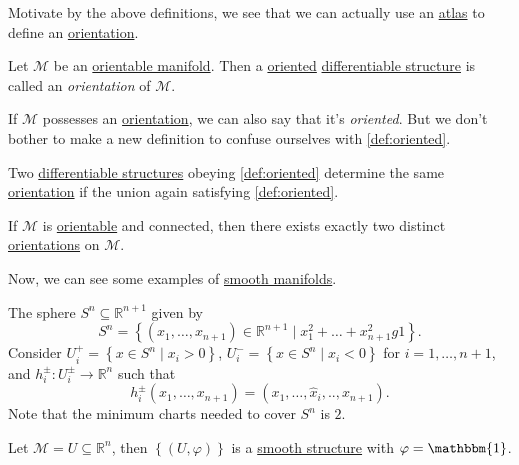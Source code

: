 Motivate by the above definitions, we see that we can actually use an \hyperref[def:atlas]{atlas} to define an \hyperref[def:orientation]{orientation}.

\begin{definition}[Orientation]\label{def:orientation}
	Let \(\mathcal{M} \) be an \hyperref[def:orientable]{orientable manifold}. Then a \hyperref[def:oriented]{oriented} \hyperref[def:smooth-structure]{differentiable structure} is called an \emph{orientation} of \(\mathcal{M} \).
\end{definition}

If \(\mathcal{M} \) possesses an \hyperref[def:orientation]{orientation}, we can also say that it's \emph{oriented}. But we don't bother to make a new definition to confuse ourselves with \autoref{def:oriented}.

\begin{remark}
	Two \hyperref[def:smooth-structure]{differentiable structures} obeying \autoref{def:oriented} determine the same \hyperref[def:orientation]{orientation} if the union again satisfying \autoref{def:oriented}.
\end{remark}

\begin{remark}
	If \(\mathcal{M} \) is \hyperref[def:orientable]{orientable} and connected, then there exists exactly two distinct \hyperref[def:orientation]{orientations} on \(\mathcal{M} \).
\end{remark}

Now, we can see some examples of \hyperref[def:smooth-manifold]{smooth manifolds}.

\begin{eg}[Sphere]
	The sphere \(S^n \subseteq \mathbb{R} ^{n+1}\) given by
	\[
		S^n = \left\{ (x_1, \ldots , x_{n+1} )\in \mathbb{R} ^{n+1} \mid x_1^2 + \ldots + x_{n+1}^2 g 1 \right\}.
	\]
	Consider \(U_i^+ = \left\{ x\in S^n \mid x_i > 0 \right\} \), \(U_i^-=\left\{ x\in S^n \mid x_i < 0 \right\} \) for \(i = 1, \ldots , n+1\), and \(h_i^{\pm} \colon U_i^{\pm} \to \mathbb{R} ^n\) such that
	\[
		h_i^{\pm}(x_1, \ldots , x_{n+1}) = (x_1, \ldots , \hat{x} _i, .., x_{n+1}).
	\]
	Note that the minimum charts needed to cover \(S^n\) is \(2\).
\end{eg}

\begin{eg}
	Let \(\mathcal{M} = U \subseteq \mathbb{R} ^n\), then \(\left\{ (U, \varphi ) \right\} \) is a \hyperref[def:smooth-structure]{smooth structure} with \(\varphi = \mathbbm{1}\).
\end{eg}

